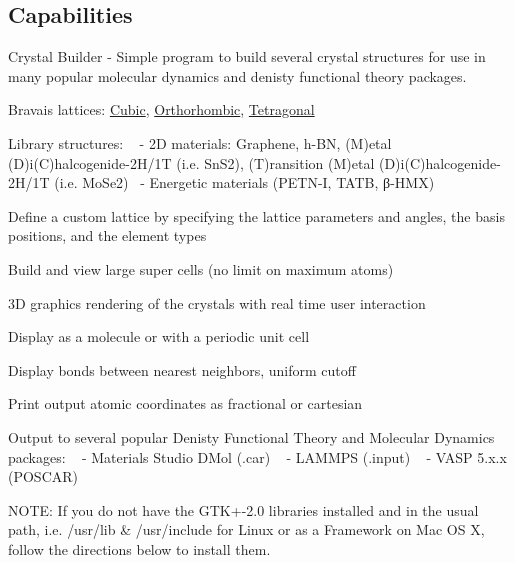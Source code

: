 \subsection*{Capabilities}

\begin{DoxyVerb}Crystal Builder - Simple program to build several crystal structures for use in many popular 
molecular dynamics and denisty functional theory packages.  
\end{DoxyVerb}



\begin{DoxyItemize}
\item Bravais lattices\+: \hyperlink{class_cubic}{Cubic}, \hyperlink{class_orthorhombic}{Orthorhombic}, \hyperlink{class_tetragonal}{Tetragonal}
\item Library structures\+: ~\newline
 -\/ 2\+D materials\+: Graphene, h-\/\+B\+N, (M)etal (D)i(\+C)halcogenide-\/2\+H/1\+T (i.\+e. Sn\+S2), (T)ransition (M)etal (D)i(\+C)halcogenide-\/2\+H/1\+T (i.\+e. Mo\+Se2)~\newline
 -\/ Energetic materials (P\+E\+T\+N-\/\+I, T\+A\+T\+B, β-\/\+H\+M\+X)
\item Define a custom lattice by specifying the lattice parameters and angles, the basis positions, and the element types
\item Build and view large super cells (no limit on maximum atoms)
\item 3\+D graphics rendering of the crystals with real time user interaction
\item Display as a molecule or with a periodic unit cell
\item Display bonds between nearest neighbors, uniform cutoff
\item Print output atomic coordinates as fractional or cartesian
\item Output to several popular Denisty Functional Theory and Molecular Dynamics packages\+: ~\newline
 -\/ Materials Studio D\+Mol (.car) ~\newline
 -\/ L\+A\+M\+M\+P\+S (.input) ~\newline
 -\/ V\+A\+S\+P 5.\+x.\+x (P\+O\+S\+C\+A\+R)
\end{DoxyItemize}

N\+O\+T\+E\+: If you do not have the G\+T\+K+-\/2.0 libraries installed and in the usual path, i.\+e. {\ttfamily /usr/lib \& /usr/include} for Linux or as a {\ttfamily Framework} on Mac O\+S X, follow the directions below to install them.





